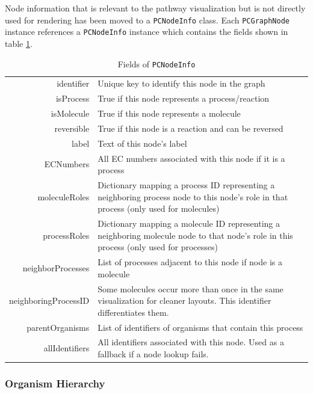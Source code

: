 Node information that is relevant to the pathway visualization but is not
directly used for rendering has been moved to a \texttt{PCNodeInfo} class. Each
\texttt{PCGraphNode} instance references a \texttt{PCNodeInfo} instance which
contains the fields shown in table \ref{fig:kegg_node_info_fields}.

\begin{table}[htbp]
\centering
\begin{tabular}{ r | p{4in}}
    identifier  & Unique key to identify this node in the graph \\
    isProcess   & True if this node represents a process/reaction \\
    isMolecule  & True if this node represents a molecule \\
    reversible  & True if this node is a reaction and can be reversed \\
    label       & Text of this node's label \\
    ECNumbers   & All EC numbers associated with this node if it is a process
    \\
    moleculeRoles   & Dictionary mapping a process ID representing a
                        neighboring process node to this node's role in that
                        process (only used for molecules) \\
    processRoles    & Dictionary mapping a molecule ID representing a
                        neighboring molecule node to that node's role in this
                        process (only used for processes) \\
    neighborProcesses   & List of processes adjacent to this node if node is a
                            molecule \\
    neighboringProcessID    & Some molecules occur more than once in the same
                                visualization for cleaner layouts. This
                                identifier differentiates them. \\
    parentOrganisms & List of identifiers of organisms that contain this process
    \\
    allIdentifiers  & All identifiers associated with this node. Used as a
                        fallback if a node lookup fails. \\
\end{tabular}
    \caption{Fields of \texttt{PCNodeInfo}}
    \label{fig:kegg_node_info_fields}
\end{table}

\subsubsection{Organism Hierarchy}

